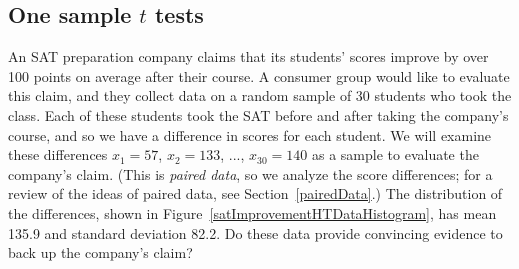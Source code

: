 %
%
%
%
%













\subsection{One sample $t$ tests}
\label{oneSampleTTests}


An SAT preparation company claims that its students' scores improve by over 100 points on average after their course. A consumer group would like to evaluate this claim, and they collect data on a random sample of 30 students who took the class. Each of these students took the SAT before and after taking the company's course, and so we have a difference in scores for each student. We will examine these differences $x_1=57$, $x_2=133$, ..., $x_{30}=140$ as a sample to evaluate the company's claim. 
(This is \emph{paired data}, so we analyze the score differences; for a review of the ideas of paired data, see Section~\ref{pairedData}.) 
The distribution of the differences, shown in Figure~\ref{satImprovementHTDataHistogram}, has mean 135.9 and standard deviation 82.2. Do these data provide convincing evidence to back up the company's claim? 

